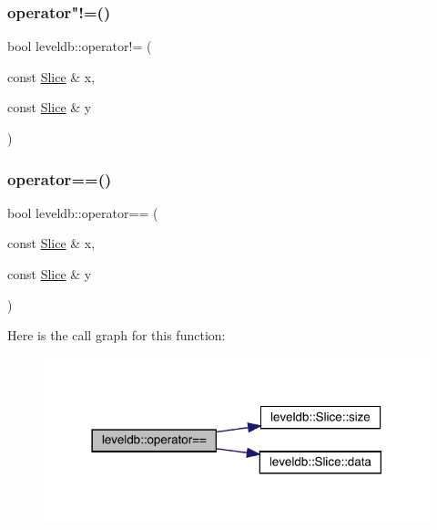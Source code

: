 \subsubsection{\texorpdfstring{operator"!=()}{operator!=()}}
{\footnotesize\ttfamily bool leveldb\+::operator!= (\begin{DoxyParamCaption}\item[{const \mbox{\hyperlink{classleveldb_1_1_slice}{Slice}} \&}]{x,  }\item[{const \mbox{\hyperlink{classleveldb_1_1_slice}{Slice}} \&}]{y }\end{DoxyParamCaption})\hspace{0.3cm}{\ttfamily [inline]}}

\mbox{\label{namespaceleveldb_a53c443def2386ea299281cf36de3ae4b}} 
\subsubsection{\texorpdfstring{operator==()}{operator==()}}
{\footnotesize\ttfamily bool leveldb\+::operator== (\begin{DoxyParamCaption}\item[{const \mbox{\hyperlink{classleveldb_1_1_slice}{Slice}} \&}]{x,  }\item[{const \mbox{\hyperlink{classleveldb_1_1_slice}{Slice}} \&}]{y }\end{DoxyParamCaption})\hspace{0.3cm}{\ttfamily [inline]}}

Here is the call graph for this function\+:
\nopagebreak
\begin{figure}[H]
\begin{center}
\leavevmode
\includegraphics[width=318pt]{namespaceleveldb_a53c443def2386ea299281cf36de3ae4b_cgraph}
\end{center}
\end{figure}
\mbox{\label{namespaceleveldb_aa6901bbe2ff664657a6d4e01ba7d6d39}} 
